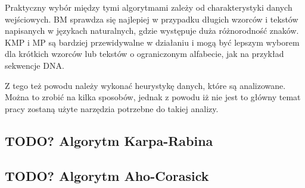 Praktyczny wybór między tymi algorytmami zależy od charakterystyki danych
wejściowych. BM sprawdza się najlepiej w przypadku długich wzorców i tekstów
napisanych w językach naturalnych, gdzie występuje duża różnorodność znaków.
KMP i MP są bardziej przewidywalne w działaniu i mogą być lepszym wyborem dla 
krótkich wzorców lub tekstów o ograniczonym alfabecie, jak na przykład sekwencje
DNA.

Z tego też powodu należy wykonać heurystykę danych, które są analizowane.
Można to zrobić na kilka sposobów, jednak z powodu iż nie jest to główny temat
pracy zostaną użyte narzędzia potrzebne do takiej analizy.


\subsection{TODO? Algorytm Karpa-Rabina}
\subsection{TODO? Algorytm Aho-Corasick}